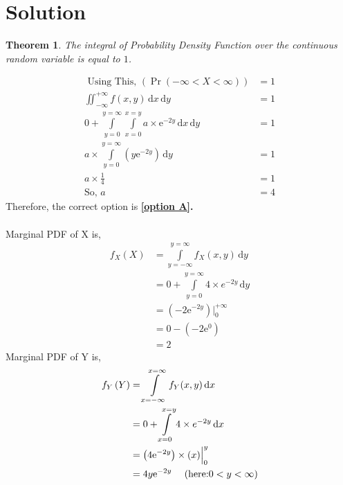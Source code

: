 \documentclass[journal,12pt,twocolumn]{IEEEtran}
\providecommand{\pr}[1]{\ensuremath{\Pr\left(#1\right)}}
\providecommand{\brak}[1]{\ensuremath{\left(#1\right)}}
\newtheorem{theorem}{Theorem}
\providecommand{\pr}[1]{\ensuremath{\Pr\left(#1\right)}}
\providecommand{\brak}[1]{\ensuremath{\left(#1\right)}}
\begin{document}
\section*{Solution}
\begin{theorem}
    The integral of Probability Density Function over the continuous random variable is equal to $1$.
    \end{theorem}
\begin{align}
\text{ Using This, } (\pr{-\infty < X < \infty}) &= 1  \\
\iint_{-\infty}^{+\infty}  f(x,y) \, \mathrm{d}x \, \mathrm{d}y &= 1 \\
 0 + \int \limits_{y=0}^{y=\infty} \int \limits_{x=0}^{x=y} a \times \mathrm{e}^{-2y} \, \mathrm{d}x\, \mathrm{d}y  &= 1 \\
  a \times \int \limits_{y=0}^{y=\infty}  \brak{y\mathrm{e}^{-2y} } \, \mathrm{d}y &= 1 \\
a \times \frac{1}{4} &= 1 \\
\text{So,  } a &= 4
\end{align}
 Therefore, the correct option is \textbf{\ref{option A}.  } \\\\
 
 Marginal PDF of X is,\\
 \begin{align}
 f_X\brak{X} &= \int \limits_{y=-\infty}^{y=\infty} f_X(x,y) \, \mathrm{d}y\\
 &= 0 + \int \limits_{y=0}^{y=\infty} 4 \times {e}^{-2y} \, \mathrm{d}y \\
  &= \brak{ -2\mathrm{e}^{-2y} }\Bigr|_{0}^{+\infty }  \\ 
  &= 0 - \brak{-2\mathrm{e}^0} \\
  &= 2 
 \end{align}
 Marginal PDF of Y is,
 \begin{align}
  f_Y\brak{Y} &= \int \limits_{x=-\infty}^{x=\infty} f_Y(x,y) \, \mathrm{d}x\\ 
  &= 0 + \int \limits_{x=0}^{x=y} 4 \times {e}^{-2y} \, \mathrm{d}x \\ 
  &= \brak{ 4\mathrm{e}^{-2y}} \times \brak{x}\Bigr|_{0}^{y }  \\
  &=  4y\mathrm{e}^{-2y} \hspace{0.4cm} \brak{ \text{here:} 0<y<\infty}
 \end{align}
\end{document}

